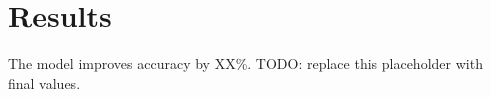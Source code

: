 \section{Results}
The model improves accuracy by XX\%.
TODO: replace this placeholder with final values.
